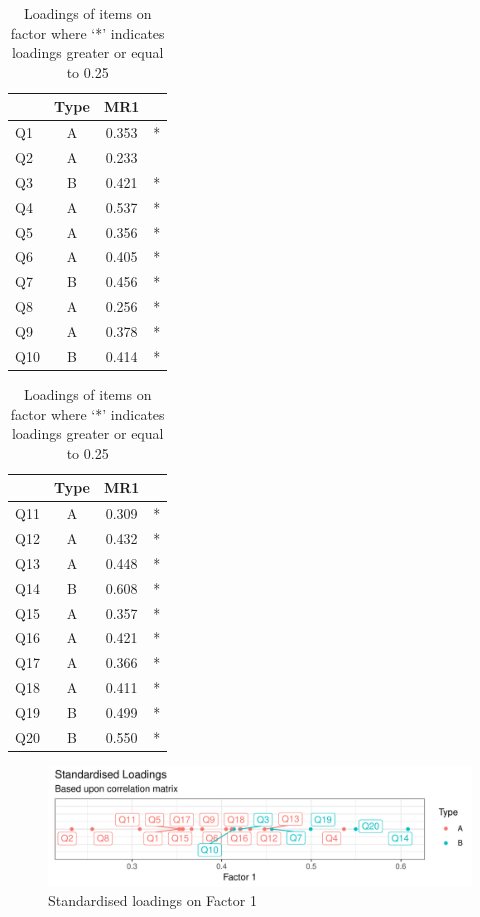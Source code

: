 \documentclass[a4paper]{report}
\begin{document}
\begin{table}[ht]
  \begin{minipage}{0.5\linewidth}
    \centering
    \begin{tabular}{lccc}
      \hline
    & Type & MR1 & \\ 
      \hline
    Q1 & A & 0.353 & * \\ 
      Q2 & A & 0.233 &  \\ 
      Q3 & B & 0.421 & * \\ 
      Q4 & A & 0.537 & * \\ 
      Q5 & A & 0.356 & * \\ 
      Q6 & A & 0.405 & * \\ 
      Q7 & B & 0.456 & * \\ 
      Q8 & A & 0.256 & * \\ 
      Q9 & A & 0.378 & * \\ 
      Q10 & B & 0.414 & * \\ 
      \hline
    \end{tabular}
  \end{minipage}%
  \begin{minipage}{0.5\linewidth}
    \centering
    \begin{tabular}{lccc}
      \hline
     & Type & MR1 & \\ 
      \hline
    Q11 & A & 0.309 & * \\ 
      Q12 & A & 0.432 & * \\ 
      Q13 & A & 0.448 & * \\ 
      Q14 & B & 0.608 & * \\ 
      Q15 & A & 0.357 & * \\ 
      Q16 & A & 0.421 & * \\ 
      Q17 & A & 0.366 & * \\ 
      Q18 & A & 0.411 & * \\ 
      Q19 & B & 0.499 & * \\ 
      Q20 & B & 0.550 & * \\ 
       \hline
    \end{tabular}  
  \end{minipage}
  \caption{\label{tab:EFA_pre17_1}Loadings of items on factor where `*' indicates loadings greater or equal to 0.25}
\end{table}

\begin{figure}[H]
  \centering
  \includegraphics[width=\linewidth]{fig/EFA_pre17_1.pdf}
  \caption{\label{fig:EFA_pre17_1}Standardised loadings on Factor 1}
\end{figure}
\end{document}

